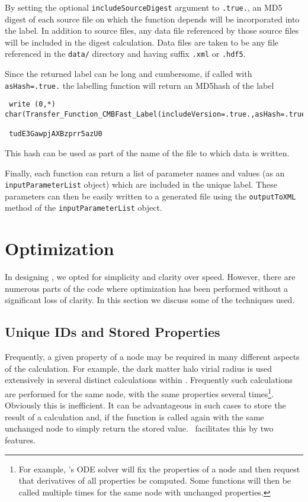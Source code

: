 By setting the optional {\tt includeSourceDigest} argument to {\tt .true.}, an MD5 digest of each source file on which the function depends will be incorporated into the label. In addition to source files, any data file referenced by those source files will be included in the digest calculation. Data files are taken to be any file referenced in the {\tt data/} directory and having suffix {\tt .xml} or {\tt .hdf5}.

Since the returned label can be long and cumbersome, if called with {\tt asHash=.true.} the labelling function will return an \gls{MD5hash} of the label
\begin{verbatim}
 write (0,*) char(Transfer_Function_CMBFast_Label(includeVersion=.true.,asHash=.true.))
 
 tudE3GawpjAXBzprr5azU0
\end{verbatim}
This hash can be used as part of the name of the file to which data is written.

Finally, each function can return a list of parameter names and values (as an {\tt inputParameterList} object) which are included in the unique label. These parameters can then be easily written to a generated file using the {\tt outputToXML} method of the {\tt inputParameterList} object.

\section{Optimization}\label{sec:Optimization}

In designing \glc, we opted for simplicity and clarity over speed. However, there are numerous parts of the code where optimization has been performed without a significant loss of clarity. In this section we discuss some of the techniques used.

\subsection{Unique IDs and Stored Properties}

Frequently, a given property of a node may be required in many different aspects of the calculation. For example, the dark matter halo virial radius is used extensively in several distinct calculations within \glc. Frequently such calculations are performed for the same node, with the same properties several times\footnote{For example, \glc's ODE solver will fix the properties of a node and then request that derivatives of all properties be computed. Some functions will then be called multiple times for the same node with unchanged properties.}. Obviously this is inefficient. It can be advantageous in such cases to store the result of a calculation and, if the function is called again with the same unchanged node to simply return the stored value. \glc\ facilitates this by two features.


